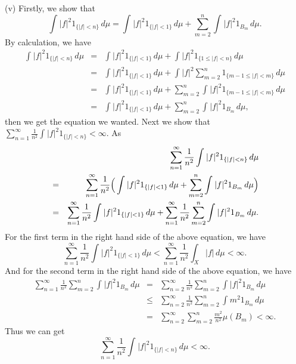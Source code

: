\documentclass[12pt,a4paper]{ctexart}
\begin{document}
(v) Firstly, we show that 
\begin{equation*}
    \int_{}^{} |f|^{2} 1_{\{|f| < n\}} \, d \mu = \int_{}^{} |f|^{2} 1_{\{|f| < 1\}} \, d \mu + \sum_{m=2}^{n} \int_{}^{} |f|^{2} 1_{B_{m}} \, d \mu.
\end{equation*}
By calculation, we have
\begin{eqnarray*}
    \int_{}^{} |f|^{2} 1_{\{|f| < n\}} \, d \mu & = & \int_{}^{} |f|^{2} 1_{\{|f| < 1\}} \, d \mu + \int_{}^{} |f|^{2} 1_{\{1 \leq |f| < n\}} \, d \mu \\
    & = & \int_{}^{} |f|^{2} 1_{\{|f| < 1\}} \, d \mu + \int_{}^{} |f|^{2} \sum_{m=2}^{n} 1_{\{m-1 \leq |f| < m\}} \, d \mu \\
    & = & \int_{}^{} |f|^{2} 1_{\{|f| < 1\}} \, d \mu + \sum_{m=2}^{n} \int_{}^{} |f|^{2}  1_{\{m-1 \leq |f| < m\}} \, d \mu \\
    & = & \int_{}^{} |f|^{2} 1_{\{|f| < 1\}} \, d \mu + \sum_{m=2}^{n} \int_{}^{} |f|^{2} 1_{B_{m}} \, d \mu,
\end{eqnarray*}
then we get the equation we wanted. Next we show that $\sum_{n=1}^{\infty} \frac{1}{n^{2}} \int_{}^{} |f|^{2} 1_{\{|f| < n\}} < \infty $. As
\begin{eqnarray*}
   &  & \sum_{n=1}^{\infty} \frac{1}{n^{2}} \int_{}^{} |f|^{2} 1_{\{|f| < n\}} \, d \mu  \\
    & = &  \sum_{n=1}^{\infty} \frac{1}{n^{2}} \Big{(} \int_{}^{} |f|^{2} 1_{\{|f| < 1\}} \, d \mu + \sum_{m=2}^{n} \int_{}^{} |f|^{2} 1_{B_{m}} \, d \mu \Big{)} \\
    & = & \sum_{n=1}^{\infty} \frac{1}{n^{2}} \int_{}^{} |f|^{2} 1_{\{|f| < 1\}} \, d \mu + \sum_{n=1}^{\infty} \frac{1}{n^{2}} \sum_{m=2}^{n} \int_{}^{} |f|^{2} 1_{B_{m}} \, d \mu.
\end{eqnarray*}
For the first term in the right hand side of the above equation, we have
\begin{equation*}
    \sum_{n=1}^{\infty} \frac{1}{n^{2}} \int_{}^{} |f|^{2} 1_{\{|f| < 1\}} \, d \mu < \sum_{n=1}^{\infty} \frac{1}{n^{2}} \int_{X}^{} |f| \, d \mu  < \infty.
\end{equation*}
And for the second term in the right hand side of the above equation, we have
\begin{eqnarray*}
    \sum_{n=1}^{\infty} \frac{1}{n^{2}} \sum_{m=2}^{n} \int_{}^{} |f|^{2} 1_{B_{m}} \, d \mu & = & \sum_{n=2}^{\infty} \frac{1}{n^{2}} \sum_{m=2}^{n} \int_{}^{} |f|^{2} 1_{B_{m}} \, d \mu \\
   & \leq & \sum_{n=2}^{\infty} \frac{1}{n^{2}} \sum_{m=2}^{n} \int_{}^{} m^{2} 1_{B_{m}} \, d \mu \\
   & = & \sum_{n=2}^{\infty} \sum_{m=2}^{n} \frac{m^{2}}{n^{2}} \mu(B_{m}) < \infty.
\end{eqnarray*}
Thus we can get
\begin{equation*}
    \sum_{n=1}^{\infty} \frac{1}{n^{2}} \int_{}^{} |f|^{2} 1_{\{|f| < n\}} \, d \mu  < \infty.
\end{equation*}
\end{document}
